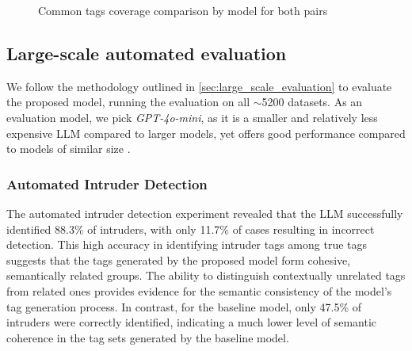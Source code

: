 \begin{figure}[h]
    \centering
    \hfill
    \caption{Common tags coverage comparison by model for both pairs}
    \label{fig:common_tags_coverage_comparison}
\end{figure}

\subsection{Large-scale automated evaluation}
We follow the methodology outlined in \cref{sec:large_scale_evaluation} to evaluate the proposed model, running the evaluation on all $\sim$5200 datasets. As an evaluation model, we pick \textit{GPT-4o-mini}, as it is a smaller and relatively less expensive LLM compared to larger models, yet offers good performance compared to models of similar size \cite{noauthor_gpt-4o_nodate}.

\subsubsection{Automated Intruder Detection}
The automated intruder detection experiment revealed that the LLM successfully identified 88.3\% of intruders, with only 11.7\% of cases resulting in incorrect detection. This high accuracy in identifying intruder tags among true tags suggests that the tags generated by the proposed model form cohesive, semantically related groups. The ability to distinguish contextually unrelated tags from related ones provides evidence for the semantic consistency of the model's tag generation process. In contrast, for the baseline model, only 47.5\% of intruders were correctly identified, indicating a much lower level of semantic coherence in the tag sets generated by the baseline model.

